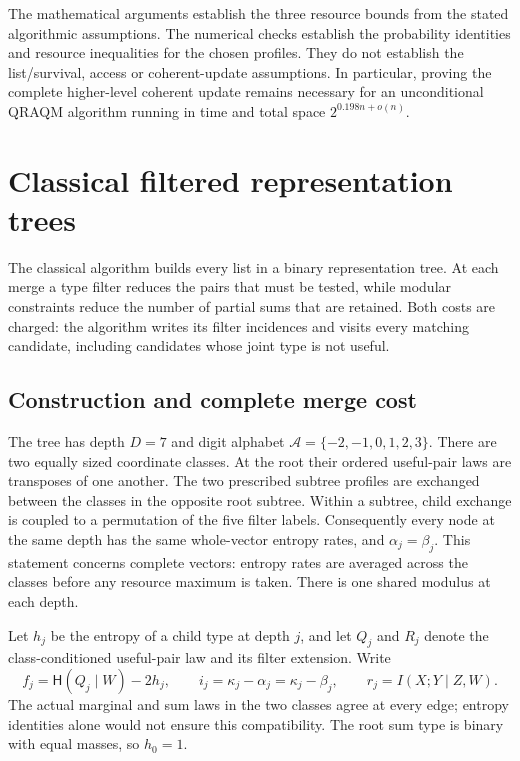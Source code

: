 \documentclass[10pt,a4paper]{article}
\theoremstyle{definition}
\newcommand{\HH}{\mathsf H}
\begin{document}
The mathematical arguments establish the three resource bounds from
the stated algorithmic assumptions. The numerical checks establish the
probability identities and resource inequalities for the chosen profiles.
They do not establish the list/survival, access or coherent-update
assumptions. In particular, proving the complete higher-level coherent
update remains necessary for an unconditional QRAQM algorithm running in time and total space
$2^{0.198n+o(n)}$.



\section{Classical filtered representation trees}
\label{sec:classical}
The classical algorithm builds every list in a binary representation tree.
At each merge a type filter reduces the pairs that must be tested, while
modular constraints reduce the number of partial sums that are retained.
Both costs are charged: the algorithm writes its filter incidences and
visits every matching candidate, including candidates whose joint type
is not useful.

\subsection{Construction and complete merge cost}
The tree has depth $D=7$ and digit alphabet
$\mathcal A=\{-2,-1,0,1,2,3\}$. There are two equally sized coordinate
classes. At the root their ordered useful-pair laws are transposes of one
another. The two prescribed subtree profiles are exchanged between the
classes in the opposite root subtree. Within a subtree, child exchange
is coupled to a permutation of the five filter labels. Consequently every
node at the same depth has the same whole-vector entropy rates, and
$\alpha_j=\beta_j$. This statement concerns complete vectors: entropy
rates are averaged across the classes before any resource maximum is
taken. There is one shared modulus at each depth.

Let $h_j$ be the entropy of a child type at depth $j$, and let $Q_j$ and
$R_j$ denote the class-conditioned useful-pair law and its filter
extension. Write
\[
 f_j=\HH(Q_j\mid W)-2h_j,\qquad
 i_j=\kappa_j-\alpha_j=\kappa_j-\beta_j,\qquad
 r_j=I(X;Y\mid Z,W).
\]
The actual marginal and sum laws in the two classes agree at every edge;
entropy identities alone would not ensure this compatibility. The root
sum type is binary with equal masses, so $h_0=1$.
\end{document}
